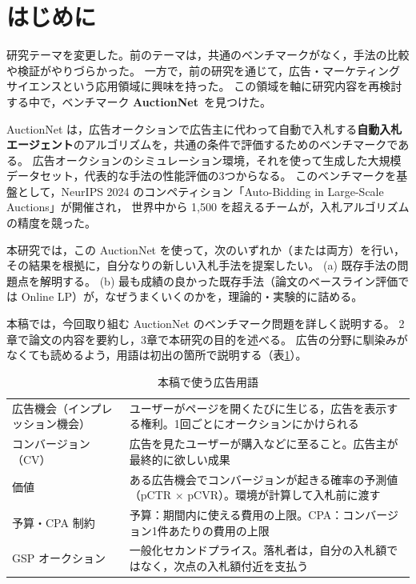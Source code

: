 \documentclass[twocolumn, a4paper, 10pt]{ujarticle}
\begin{document}
\maketitle

\section{はじめに}

研究テーマを変更した。前のテーマは，共通のベンチマークがなく，手法の比較や検証がやりづらかった。
一方で，前の研究を通じて，広告・マーケティングサイエンスという応用領域に興味を持った。
この領域を軸に研究内容を再検討する中で，ベンチマーク \textbf{AuctionNet}\,\cite{su2024} を見つけた。

AuctionNet は，広告オークションで広告主に代わって自動で入札する\textbf{自動入札エージェント}のアルゴリズムを，共通の条件で評価するためのベンチマークである。
広告オークションのシミュレーション環境，それを使って生成した大規模データセット，代表的な手法の性能評価の3つからなる。
このベンチマークを基盤として，NeurIPS 2024 のコンペティション「Auto-Bidding in Large-Scale Auctions」が開催され，
世界中から 1,500 を超えるチームが，入札アルゴリズムの精度を競った。

本研究では，この AuctionNet を使って，次のいずれか（または両方）を行い，その結果を根拠に，自分なりの新しい入札手法を提案したい。
(a) 既存手法の問題点を解明する。
(b) 最も成績の良かった既存手法（論文のベースライン評価では Online LP）が，なぜうまくいくのかを，理論的・実験的に詰める。

本稿では，今回取り組む AuctionNet のベンチマーク問題を詳しく説明する。
2章で論文の内容を要約し，3章で本研究の目的を述べる。
広告の分野に馴染みがなくても読めるよう，用語は初出の箇所で説明する（表\ref{tab:terms}）。

\begin{table}[H]
\centering
\caption{本稿で使う広告用語}
\label{tab:terms}
\footnotesize
\begin{tabularx}{\linewidth}{@{}lX@{}}
\toprule
広告機会（インプレッション機会） & ユーザーがページを開くたびに生じる，広告を表示する権利。1回ごとにオークションにかけられる \\
コンバージョン（CV） & 広告を見たユーザーが購入などに至ること。広告主が最終的に欲しい成果 \\
価値 & ある広告機会でコンバージョンが起きる確率の予測値（pCTR $\times$ pCVR）。環境が計算して入札前に渡す \\
予算・CPA 制約 & 予算：期間内に使える費用の上限。CPA：コンバージョン1件あたりの費用の上限 \\
GSP オークション & 一般化セカンドプライス。落札者は，自分の入札額ではなく，次点の入札額付近を支払う \\
\bottomrule
\end{tabularx}
\end{table}
\end{document}

